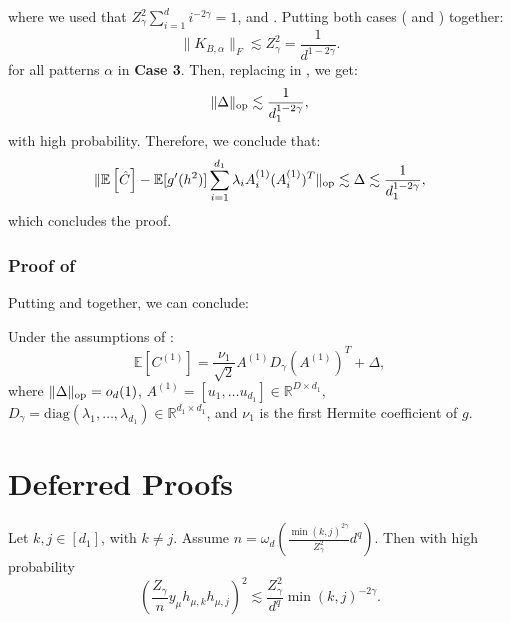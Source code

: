 \documentclass[]{article}
\numberwithin{equation}{section}
\theoremstyle{definition}
\newcommand{\RR}{\mathbb{R}}
\newcommand{\EE}{\mathbb{E}}
\def\op{{\rm op}}
\begin{document}
where we used that $Z_{\gamma}^2\sum_{i=1}^{d} i^{-2\gamma}  = 1$, and . Putting both cases ( and ) together: 
\begin{equation}
    \|K_{B,\alpha}\|_F \lesssim Z_{\gamma}^2 = \dfrac{1}{d^{1-2\gamma}}.  
\end{equation}
for all patterns $\alpha$ in \textbf{Case 3}. Then, replacing in , we get: 
\begin{equation}
    \|\Delta\|_\op \lesssim \dfrac{1}{d_1^{1-2\gamma}},
\end{equation}
with high probability. Therefore, we conclude that: 
\begin{equation}
    \| \EE\left [\hat{C} \right ] -  \EE[g'(h^2)] \sum_{i=1}^{d_1} \lambda_i A^{(1)}_i (A 
_i^{(1)})^T\|_\op \lesssim  \Delta \lesssim \dfrac{1}{d_1^{1-2\gamma}},
\end{equation}
which concludes the proof. 

\subsubsection{\texorpdfstring{Proof of }{Proof of Lemma}}

Putting  and  together, we can conclude:
\begin{corollary}
Under the assumptions of : 
\[
\EE \left [C^{(1)} \right ] = \dfrac{\nu_{1}}{\sqrt{2}}A^{(1)} D_{\gamma} (A^{(1)})^T + \Delta, 
\]
where $\| \Delta \|_\op = o_{d}(1)$,  $A^{(1)} = [u_1, \dots u_{d_1}] \in \mathbb{R}^{D \times d_1}$,  $D_\gamma = \mathrm{diag} ( \lambda_1, \dots, \lambda_{d_1}) \in \RR^{d_1 \times d_1}$, and $\nu_{1}$ is the first Hermite coefficient of $g$.
\end{corollary}






\section{Deferred Proofs}
\label{seciton:deferred_proofs}
\begin{lemma}
    Let $k,j \in [d_1]$, with $k \not =j$. Assume $n = \omega_{d}(\frac{\min(k,j)^{2\gamma}}{Z_\gamma ^{2}}d^{q} )$. Then with high probability 
    $$
        \left ( \dfrac{Z_\gamma }{n} y_\mu h_{\mu,k} h_{\mu,j} \right )^{2} \lesssim \dfrac{Z_\gamma ^2}{d^{q}} \min(k,j)^{-2\gamma}. 
    $$
    \label{lemma:bound_square_y_s}
\end{lemma}
\end{document}
